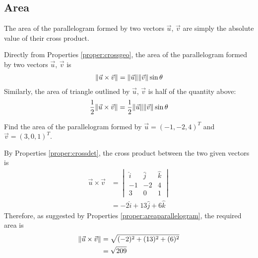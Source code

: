 \subsection{Area}
The area of the parallelogram formed by two vectors $\vec{u}$, $\vec{v}$ are simply the absolute value of their cross product.
\begin{center}
\end{center}
\begin{proper}
\label{proper:areaparallelogram}
Directly from Properties \ref{proper:crossgeo}, the area of the parallelogram formed by two vectors $\vec{u}$, $\vec{v}$ is
\begin{align*}
\norm{\vec{u} \times \vec{v}} = \norm{\vec{u}}\norm{\vec{v}}\sin\theta
\end{align*}
Similarly, the area of triangle outlined by $\vec{u}$, $\vec{v}$ is half of the quantity above:
\begin{align*}
\frac{1}{2}\norm{\vec{u} \times \vec{v}} = \frac{1}{2}\norm{\vec{u}}\norm{\vec{v}}\sin\theta   
\end{align*}
\end{proper}

\begin{exmp}
Find the area of the parallelogram formed by $\vec{u} = (-1, -2, 4)^T$ and $\vec{v} = (3, 0, 1)^T$.
\end{exmp}
\begin{solution}
By Properties \ref{proper:crossdet}, the cross product between the two given vectors is
\begin{align*}
\vec{u} \times \vec{v} &=
\begin{vmatrix}
\hat{i} & \hat{j} & \hat{k} \\
-1 & -2 & 4 \\
3 & 0 & 1
\end{vmatrix} \\
&= -2\hat{i} + 13\hat{j} + 6\hat{k}
\end{align*}
Therefore, as suggested by Properties \ref{proper:areaparallelogram}, the required area is
\begin{align*}
\norm{\vec{u} \times \vec{v}} &= \sqrt{(-2)^2 + (13)^2 + (6)^2} \\
&= \sqrt{209}
\end{align*}
\end{solution}

